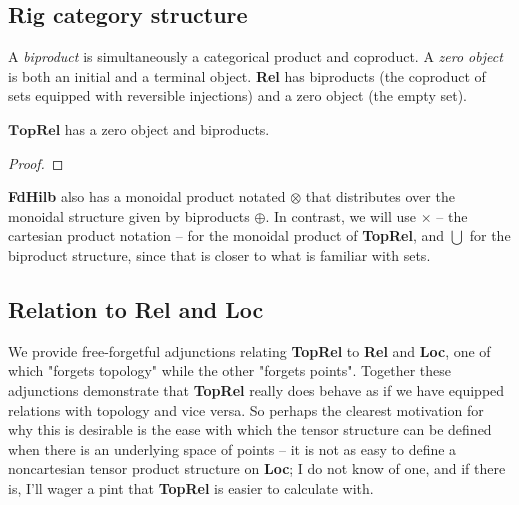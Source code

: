 \subsection{Rig category structure}

\begin{defn}
A \emph{biproduct} is simultaneously a categorical product and coproduct. A \emph{zero object} is both an initial and a terminal object. \textbf{Rel} has biproducts (the coproduct of sets equipped with reversible injections) and a zero object (the empty set).
\end{defn}

\begin{proposition}
$\mathbf{TopRel}$ has a zero object and biproducts.
\begin{proof}
\end{proof}
\end{proposition}

\begin{notation}
\textbf{FdHilb} also has a monoidal product notated $\otimes$ that distributes over the monoidal structure given by biproducts $\oplus$. In contrast, we will use $\times$ -- the cartesian product notation -- for the monoidal product of \textbf{TopRel}, and $\bigcup$ for the biproduct structure, since that is closer to what is familiar with sets.
\end{notation}

\subsection{Relation to \textbf{Rel} and \textbf{Loc}}

We provide free-forgetful adjunctions relating \textbf{TopRel} to \textbf{Rel} and \textbf{Loc}, one of which "forgets topology" while the other "forgets points". Together these adjunctions demonstrate that \textbf{TopRel} really does behave as if we have equipped relations with topology and vice versa. So perhaps the clearest motivation for why this is desirable is the ease with which the tensor structure can be defined when there is an underlying space of points -- it is not as easy to define a noncartesian tensor product structure on \textbf{Loc}; I do not know of one, and if there is, I'll wager a pint that \textbf{TopRel} is easier to calculate with.


